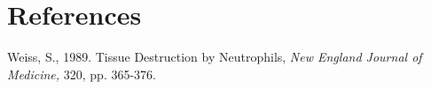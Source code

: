 \documentclass[10pt]{report}
\begin{document}
\lipsum[4]

\newpage
\section*{References}

Weiss, S., 1989. Tissue Destruction by Neutrophils, \textit{New England Journal of Medicine,} 320, pp. 365-376.
\newline
\newline
\end{document}
